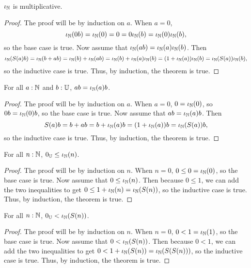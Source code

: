 \documentclass[../math.tex]{subfiles}
\begin{document}
\begin{instance}
    $\iota_{\mathbb{N}}$ is multiplicative.
\end{instance}
\begin{proof}
    The proof will be by induction on $a$.  When $a = 0$,
    \[
        \iota_{\mathbb{N}}(0b) = \iota_{\mathbb{N}}(0) = 0 = 0\iota_{\mathbb{N}}(b) = \iota_{\mathbb{N}}(0)\iota_{\mathbb{N}}(b),
    \]
    so the base case is true.  Now assume that $\iota_{\mathbb{N}}(ab) = \iota_{\mathbb{N}}(a)\iota_{\mathbb{N}}(b)$.
    Then
    \[
        \iota_{\mathbb{N}}(S(a)b) = \iota_{\mathbb{N}}(b + ab) = \iota_{\mathbb{N}}(b) + \iota_{\mathbb{N}}(ab) = \iota_{\mathbb{N}}(b) + \iota_{\mathbb{N}}(a)\iota_{\mathbb{N}}(b) =
        (1 + \iota_{\mathbb{N}}(a)) \iota_{\mathbb{N}}(b) = \iota_{\mathbb{N}}(S(a))\iota_{\mathbb{N}}(b),
    \]
    so the inductive case is true.  Thus, by induction, the theorem is true.
\end{proof}

\begin{theorem}
    For all $a : \mathbb{N}$ and $b : \mathbb{U}$, $ab = \iota_{\mathbb{N}}(a)b$.
\end{theorem}
\begin{proof}
    The proof will be by induction on $a$.  When $a = 0$, $0 = \iota_{\mathbb{N}}(0)$, so $0b =
    \iota_{\mathbb{N}}(0)b$, so the base case is true.  Now assume that $ab = \iota_{\mathbb{N}}(a)b$.  Then
    \[
        S(a)b = b + ab = b + \iota_{\mathbb{N}}(a)b = (1 + \iota_{\mathbb{N}}(a))b = \iota_{\mathbb{N}}(S(a))b,
    \]
    so the inductive case is true.  Thus, by induction, the theorem is true.
\end{proof}

\begin{theorem} \label{from_nat_pos2}
    For all $n : \mathbb{N}$, $0_{\mathbb{U}} \leq \iota_{\mathbb{N}}(n)$.
\end{theorem}
\begin{proof}
    The proof will be by induction on $n$.  When $n = 0$, $0 \leq 0 = \iota_{\mathbb{N}}(0)$,
    so the base case is true.  Now assume that $0 \leq \iota_{\mathbb{N}}(n)$.  Then because $0
    \leq 1$, we can add the two inequalities to get $0 \leq 1 + \iota_{\mathbb{N}}(n) =
    \iota_{\mathbb{N}}(S(n))$, so the inductive case is true.  Thus, by induction, the theorem
    is true.
\end{proof}

\begin{theorem} \label{from_nat_pos}
    For all $n : \mathbb{N}$, $0_{\mathbb{U}} < \iota_{\mathbb{N}}(S(n))$.
\end{theorem}
\begin{proof}
    The proof will be by induction on $n$.  When $n = 0$, $0 < 1 = \iota_{\mathbb{N}}(1)$, so
    the base case is true.  Now assume that $0 < \iota_{\mathbb{N}}(S(n))$.  Then because $0 <
    1$, we can add the two inequalities to get $0 < 1 + \iota_{\mathbb{N}}(S(n)) =
    \iota_{\mathbb{N}}(S(S(n)))$, so the inductive case is true.  Thus, by induction, the
    theorem is true.
\end{proof}
\end{document}
